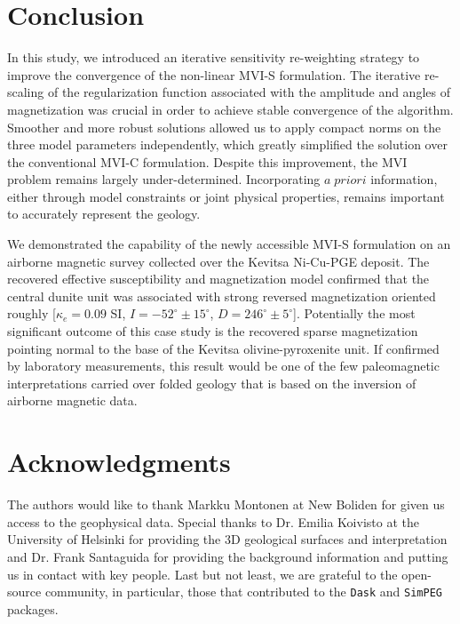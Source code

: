 \documentclass[paper]{geophysics}
\begin{document}
\section{Conclusion}
In this study, we introduced an iterative sensitivity re-weighting strategy to improve the convergence of the non-linear MVI-S formulation.
The iterative re-scaling of the regularization function associated with the amplitude and angles of magnetization was crucial in order to achieve stable convergence of the algorithm.
Smoother and more robust solutions allowed us to apply compact norms on the three model parameters independently, which greatly simplified the solution over the conventional MVI-C formulation. Despite this improvement, the MVI problem remains largely under-determined. Incorporating $a \; priori$ information, either through model constraints or joint physical properties, remains important to accurately represent the geology.

We demonstrated the capability of the newly accessible MVI-S formulation on an airborne magnetic survey collected over the Kevitsa Ni-Cu-PGE deposit. The recovered effective susceptibility and magnetization model confirmed that the central dunite unit was associated with strong reversed magnetization oriented roughly [$\kappa_{e} = 0.09$ SI, $I=-52^\circ \pm 15^\circ$, $D=246^\circ \pm 5^\circ$].
Potentially the most significant outcome of this case study is the recovered sparse magnetization pointing normal to the base of the Kevitsa olivine-pyroxenite unit. If confirmed by laboratory measurements, this result would be one of the few paleomagnetic interpretations carried over folded geology that is based on the inversion of airborne magnetic data.

\section{Acknowledgments}
The authors would like to thank Markku Montonen at New Boliden for given us access to the geophysical data. Special thanks to Dr. Emilia Koivisto at the University of Helsinki for providing the 3D geological surfaces and interpretation and Dr. Frank Santaguida for providing the background information and putting us in contact with key people. Last but not least, we are grateful to the open-source community, in particular, those that contributed to the \texttt{Dask} and \texttt{SimPEG} packages.

\pagebreak
% 


\end{document}
